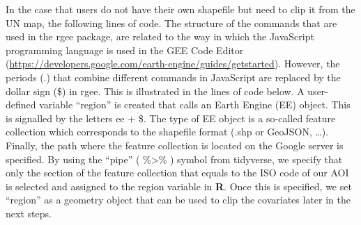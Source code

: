 \documentclass[
  10pt,
  b5paper,
  oneside]{book}
\newenvironment{Shaded}{\begin{snugshade}}{\end{snugshade}}
\newcommand{\CommentTok}[1]{\textcolor[rgb]{0.56,0.35,0.01}{\textit{#1}}}
\newcommand{\DocumentationTok}[1]{\textcolor[rgb]{0.56,0.35,0.01}{\textbf{\textit{#1}}}}
\newcommand{\FunctionTok}[1]{\textcolor[rgb]{0.00,0.00,0.00}{#1}}
\newcommand{\NormalTok}[1]{#1}
\newcommand{\OtherTok}[1]{\textcolor[rgb]{0.56,0.35,0.01}{#1}}
\newcommand{\SpecialCharTok}[1]{\textcolor[rgb]{0.00,0.00,0.00}{#1}}
\newcommand{\StringTok}[1]{\textcolor[rgb]{0.31,0.60,0.02}{#1}}
\begin{document}
In the case that users do not have their own shapefile but need to clip it from the UN map, the following lines of code. The structure of the commands that are used in the rgee package, are related to the way in which the JavaScript programming language is used in the GEE Code Editor (\url{https://developers.google.com/earth-engine/guides/getstarted}). However, the periods (.) that combine different commands in JavaScript are replaced by the dollar sign (\$) in rgee.
This is illustrated in the lines of code below. A user-defined variable ``region'' is created that calls an Earth Engine (EE) object. This is signalled by the letters ee + \$. The type of EE object is a so-called feature collection which corresponds to the shapefile format (.shp or GeoJSON, \ldots). Finally, the path where the feature collection is located on the Google server is specified. By using the ``pipe'' ( \%\textgreater\% ) symbol from tidyverse, we specify that only the section of the feature collection that equals to the ISO code of our AOI is selected and assigned to the region variable in \textbf{R}. Once this is specified, we set ``region'' as a geometry object that can be used to clip the covariates later in the next steps.

\begin{Shaded}
\end{Shaded}
\end{document}
